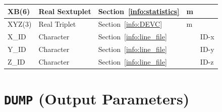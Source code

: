 \documentclass[11pt]{book}
\begin{document}
\begin{longtable}{@{\extracolsep{\fill}}|l|l|l|l|l|}
{\ct XB(6)}                 & Real Sextuplet  & Section~\ref{info:statistics}                                   & m     &               \\ \hline
{\ct XYZ(3)}                & Real Triplet    & Section~\ref{info:DEVC}                                         & m     &               \\ \hline
{\ct X\_ID}                 & Character       & Section~\ref{info:line_file}                                    &       &  {\ct ID-x}   \\ \hline
{\ct Y\_ID}                 & Character       & Section~\ref{info:line_file}                                    &       &  {\ct ID-y}   \\ \hline
{\ct Z\_ID}                 & Character       & Section~\ref{info:line_file}                                    &       &  {\ct ID-z}   \\ \hline
\end{longtable}


\vspace{\baselineskip}



\section{\texorpdfstring{{\tt DUMP}}{DUMP} (Output Parameters)}
\end{document}
